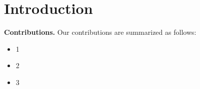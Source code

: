 \section{Introduction}

\textbf{ Contributions.} Our contributions are summarized as follows:
\begin{itemize}
\item 1
\item 2
\item 3
\end{itemize} 
